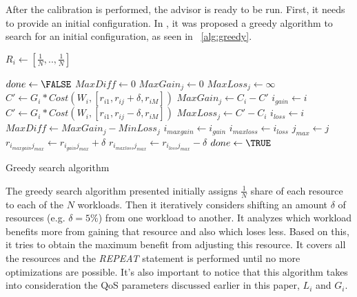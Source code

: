 After the calibration is performed, the advisor is ready to be run. First, it needs to provide an initial configuration. In \cite{Soror:2008:AVM:1376616.1376711}, it was proposed a greedy algorithm to search for an initial configuration, as seen in ~\ref{alg:greedy}.

\begin{algorithm}[H]
 \begin{algorithmic}
	\STATE $R_{i} \gets [\frac{1}{N},..,\frac{1}{N}]$
    \ENDFOR

   \STATE $done \gets \FALSE$
   \REPEAT
	\STATE $MaxDiff \gets 0$
	    \STATE $MaxGain_{j} \gets 0$
	    \STATE $MaxLoss_{j} \gets \infty$
		 \STATE $C' \gets G_{i} * Cost(W_{i},[r_{i1},  r_{ij} + \delta, r_{iM}])$ 
		     \STATE $MaxGain_{j} \gets C_{i} - C'$
		     \STATE $i_{gain} \gets i$
		 \ENDIF
		 \STATE $C' \gets G_{i} * Cost(W_{i},[r_{i1},  r_{ij} - \delta, r_{iM}])$ 
		     \STATE $MaxLoss_{j} \gets C' - C_{i}$
		     \STATE $i_{loss} \gets i$
		 \ENDIF
	    \ENDFOR
	    \STATE {}
		\STATE $MaxDiff \gets MaxGain_{j} - MinLoss_{j}$
		\STATE $i_{maxgain} \gets i_{gain}$
		\STATE $i_{maxloss} \gets i_{loss}$
		\STATE $j_{max} \gets j$
	    \ENDIF
	\ENDFOR
	    \STATE $r_{i_{maxgain}j_{max}} \gets r_{i_{gain}j_{max}} + \delta $
	    \STATE $r_{i_{maxloss}j_{max}} \gets r_{i_{loss}j_{max}} - \delta $
	\ELSE
	    \STATE $done \gets \TRUE$
	\ENDIF

 \end{algorithmic}
  \caption{Greedy search algorithm}
  \label{alg:greedy}
\end{algorithm}
The greedy search algorithm presented initially assigns $\frac{1}{N}$ share of each resource to each of the $N$ workloads. Then it iteratively considers shifting an amount $\delta$ of resources (e.g. $\delta = 5\%$) from one workload to another. It analyzes which workload benefits more from gaining that resource and also which loses less. Based on this, it tries to obtain the maximum benefit from adjusting this resource. It covers all the resources and the \textit{REPEAT} statement is performed until no more optimizations are possible. It's also important to notice that this algorithm takes into consideration the QoS parameters discussed earlier in this paper, $L_{i}$ and $G_{i}$.

